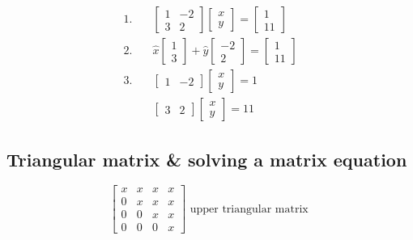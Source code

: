 \documentclass[main.tex]{subfiles}
\begin{document}
    $$
    \begin{aligned}
    1. \quad &{\left[\begin{array}{cc}
    1 & -2 \\
    3 & 2
    \end{array}\right]\left[\begin{array}{l}
    x \\
    y
    \end{array}\right]=\left[\begin{array}{l}
    1 \\
    11
    \end{array}\right]} \\
    2. \quad &\hat{x}\left[\begin{array}{l}
    1 \\
    3
    \end{array}\right]+\hat{y}\left[\begin{array}{l}
    -2 \\
    2
    \end{array}\right]=\left[\begin{array}{l}
    1 \\
    11
    \end{array}\right] \\
    3. \quad &{\left[\begin{array}{ll}
    1 & -2
    \end{array}\right]\left[\begin{array}{l}
    x \\
    y
    \end{array}\right]=1} \\
    &{\left[\begin{array}{ll}
    3 & 2
    \end{array}\right]\left[\begin{array}{l}
    x \\
    y
    \end{array}\right]=11}
    \end{aligned}
    $$

\subsection{Triangular matrix \& solving a matrix equation}

    $$
    \left[\begin{array}{llll}
    x & x & x & x \\
    0 & x & x & x \\
    0 & 0 & x & x \\
    0 & 0 & 0 & x
    \end{array}\right] \text { upper triangular matrix }
    $$
    
\end{document}
